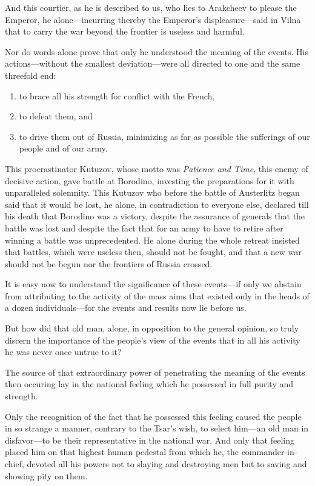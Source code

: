 And this courtier, as he is described to us, who lies to
Arakcheev to please the Emperor, he alone---incurring thereby the
Emperor's dis\-plea\-sure---said in Vilna that to carry the war 
beyond the frontier is useless and harmful.

Nor do words alone prove that only he understood the meaning of
the events. His actions---without the smallest deviation---were
all directed to one and the same threefold end:
\begin{enumerate}
\item to brace all his strength for conflict with the French,
\item to defeat them, and
\item to drive them out of Russia, minimizing as far as possible
the sufferings of our people and of our army.
\end{enumerate}

This procrastinator Kutuzov, whose motto was \emph{Patience and
Time}, this enemy of decisive action, gave battle at Borodino,
investing the preparations for it with unparalleled
solemnity. This Kutuzov who before the battle of Austerlitz began
said that it would be lost, he alone, in contradiction to
everyone else, declared till his death that Borodino was a
victory, despite the assurance of generals that the battle was
lost and despite the fact that for an army to have to retire
after winning a battle was unprecedented. He alone during the
whole retreat insisted that battles, which were useless then,
should not be fought, and that a new war should not be begun nor
the frontiers of Russia crossed.

It is easy now to understand the significance of these
events---if only we abstain from attributing to the activity of
the mass aims that existed only in the heads of a dozen
individuals---for the events and results now lie before us.

But how did that old man, alone, in opposition to the general
opinion, so truly discern the importance of the people's view of
the events that in all his activity he was never once untrue to
it?

The source of that extraordinary power of penetrating the meaning
of the events then occuring lay in the national feeling which he
possessed in full purity and strength.

Only the recognition of the fact that he possessed this feeling
caused the people in so strange a manner, contrary to the Tsar's
wish, to select him---an old man in disfavor---to be their
representative in the national war. And only that feeling placed
him on that highest human pedestal from which he, the
commander-in-chief, devoted all his powers not to slaying and
destroying men but to saving and showing pity on them.

